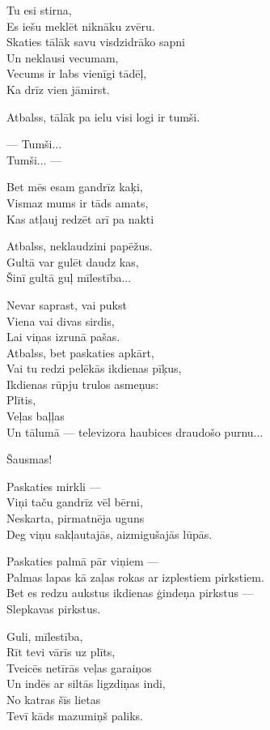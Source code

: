 \documentclass[14pt]{extarticle}
\begin{document}
Tu esi stirna,\\
Es iešu meklēt niknāku zvēru.\\
Skaties tālāk savu visdzidrāko sapni\\
Un neklausi vecumam,\\
Vecums ir labs vienīgi tādēļ,\\
Ka drīz vien jāmirst.

Atbalss, tālāk pa ielu visi logi ir tumši.

--- Tumši...\\
Tumši... ---

Bet mēs esam gandrīz kaķi,\\
Vismaz mums ir tāds amats,\\
Kas atļauj redzēt arī pa nakti

Atbalss, neklaudzini papēžus.\\
Gultā var gulēt daudz kas,\\
Šinī gultā guļ mīlestība...

Nevar saprast, vai pukst\\
Viena vai divas sirdis,\\
Lai viņas izrunā pašas.\\
Atbalss, bet paskaties apkārt,\\
Vai tu redzi pelēkās ikdienas pīķus,\\
Ikdienas rūpju trulos asmeņus:\\
Plītis,\\
Veļas baļļas\\
Un tālumā --- televizora haubices draudošo purnu...

Šausmas!

Paskaties mirkli ---\\
Viņi taču gandrīz vēl bērni,\\
Neskarta, pirmatnēja uguns\\
Deg viņu sakļautajās, aizmigušajās lūpās.

Paskaties palmā pār viņiem ---\\
Palmas lapas kā zaļas rokas ar izplestiem pirkstiem.\\
Bet es redzu aukstus ikdienas ģindeņa pirkstus ---\\
Slepkavas pirkstus.

Guli, mīlestība,\\
Rīt tevi vārīs uz plīts,\\
Tveicēs netīrās veļas garaiņos\\
Un indēs ar siltās ligzdiņas indi,\\
No katras šīs lietas\\
Tevī kāds mazumiņš paliks.
\end{document}
